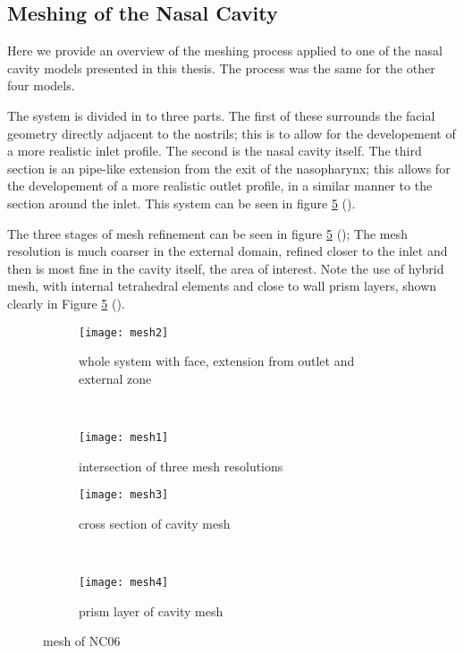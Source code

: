 \subsection{Meshing of the Nasal Cavity} 

Here we provide an overview of the meshing process applied to one of the nasal cavity models presented in this thesis. The process was the same for the other four models.

The system is divided in to three parts. The first of these surrounds the facial geometry directly adjacent to the nostrils; this is to allow for the developement of a more realistic inlet profile. The second is the nasal cavity itself. The third section is an pipe-like extension from the exit of the nasopharynx; this allows for the developement of a more realistic outlet profile, in a similar manner to the section around the inlet. This system can be seen in figure \ref{fig:cavme} ().

The three stages of mesh refinement can be seen in figure \ref{fig:cavme} (); The mesh resolution is much coarser in the external domain, refined closer to the inlet and then is most fine in the cavity itself, the area of interest. Note the use of hybrid mesh, with internal tetrahedral elements and close to wall prism layers, shown clearly in Figure \ref{fig:cavme} ().

\begin{figure}
  \begin{subfigure}[t]{0.5\textwidth}
    \texttt{[image: mesh2]}
    \caption{whole system with face, extension from outlet and external zone}
    \label{fig:mesh1}
  \end{subfigure}%
  ~%
  \begin{subfigure}[t]{0.5\textwidth}
    \texttt{[image: mesh1]}
    \caption{intersection of three mesh resolutions}
    \label{fig:mesh2}
  \end{subfigure}

  \begin{subfigure}[t]{0.5\textwidth}
    \texttt{[image: mesh3]}
    \caption{cross section of cavity mesh}
    \label{fig:mesh3}
  \end{subfigure}%
  ~%
  \begin{subfigure}[t]{0.5\textwidth}
    \texttt{[image: mesh4]}
    \caption{prism layer of cavity mesh}
    \label{fig:mesh4}
  \end{subfigure}
  \caption{mesh of NC06} \label{fig:cavme}
\end{figure}
